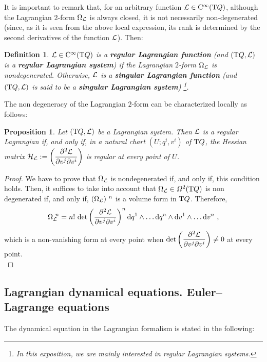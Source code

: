 \documentclass[12pt]{report}
\newtheorem{prop}[teor]{Proposition}
\newtheorem{definition}[teor]{Definition}
\def\dst{\displaystyle}
\def\qed{\ifvmode\removelastskip\fi
{\unskip\nobreak\hfil\penalty50\hbox{}\nobreak\hfil
\hbox{\vrule height1.2ex width1.2ex}\parfillskip=0pt
\finalhyphendemerits=0 \par\smallskip}}
\def\df{{\mit\Omega}}
\def\Lag{{\cal L}}
\def\d{{\rm d}}
\def\Tan{{\rm T}}
\def\Cinfty{{\rm C}^\infty}
\begin{document}
It is important to remark that, for an arbitrary function
$\Lag \in \Cinfty (\Tan Q)$, although the Lagrangian $2$-form $\Omega_\Lag$
is always closed, it is not necessarily non-degenerated
(since, as it is seen from the above local expression, its rank
is determined by the second derivatives of the function $\Lag$). Then:

\begin{definition}
$\Lag \in \Cinfty (\Tan Q)$ is a  \textbf{regular Lagrangian function}
(and  $(\Tan Q,\Lag )$ is a \textbf{regular Lagrangian system})
if the Lagrangian $2$-form $\Omega_\Lag$ is nondegenerated.
Otherwise, $\Lag$ is a  \textbf{singular Lagrangian function}
(and  $(\Tan Q,\Lag )$ is said to be a \textbf{singular Lagrangian system})
\footnote{
In this exposition, we are mainly interested in
 regular Lagrangian systems.}.
\end{definition}

The non degeneracy of the Lagrangian $2$-form
can be characterized locally as follows:

\begin{prop}
Let $(\Tan Q,\Lag )$ be a Lagrangian system. Then
$\Lag$ is a regular Lagrangian if, and only if,
in a natural chart $(U;q^i,v^i)$ of $\Tan Q$, the Hessian matrix
\(\dst {\cal H}_\Lag := \left(\frac{\partial^2\Lag}{\partial v^j \partial v^i}\right)\)
is regular at every point of $U$.
\end{prop}
\begin{proof}
We have to prove that $\Omega_\Lag$ is nondegenerated if, and only if,
this condition holds. Then, it suffices to take into account that
$\Omega_\Lag \in \df^2(\Tan Q)$
is non degenerated if, and only if, $(\Omega_\Lag)^{\ n}$
is a volume form in $\Tan Q$. Therefore,
$$
\Omega_\Lag^{\ n} =
n!\ {\rm det}\left(\frac{\partial^2\Lag}{\partial v^j \partial v^i}\right)^n
\d q^1 \wedge \ldots \d q^n \wedge\d v^1 \wedge \ldots \d v^n \ ,
$$
which  is a non-vanishing form at every point when
\(\dst{\rm det}\left(\frac{\partial^2\Lag}{\partial v^j\partial v^i}\right)
\not= 0\)
at every point.
\\ \qed \end{proof}


\subsection{Lagrangian dynamical equations.
 Euler--Lagrange equations}


The dynamical equation in the Lagrangian formalism is stated in the following:
\end{document}
